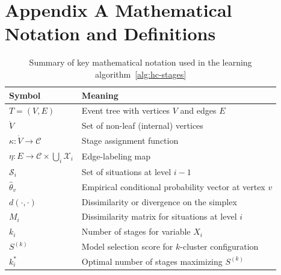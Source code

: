 \documentclass[preprint,12pt]{elsarticle}
\begin{document}



\section*{Appendix A Mathematical Notation and Definitions}
\begin{table}[H]
\centering
\caption{Summary of key mathematical notation used in the learning algorithm~\ref{alg:hc-stages}}
\begin{tabular}{ll}
\toprule
\textbf{Symbol} & \textbf{Meaning} \\
\midrule
$T = (V,E)$ & Event tree with vertices $V$ and edges $E$ \\
$\mathring{V}$ & Set of non-leaf (internal) vertices \\
$\kappa : \mathring{V} \to \mathcal{C}$ & Stage assignment function \\
$\eta : E \to \mathcal{C} \times \bigcup_i \mathcal{X}_i$ & Edge-labeling map \\
$\mathcal{S}_i$ & Set of situations at level $i-1$ \\
$\hat{\theta}_v$ & Empirical conditional probability vector at vertex $v$ \\
$d(\cdot, \cdot)$ & Dissimilarity or divergence on the simplex \\
$M_i$ & Dissimilarity matrix for situations at level $i$ \\
$k_i$ & Number of stages for variable $X_i$ \\
$S^{(k)}$ & Model selection score for $k$-cluster configuration \\
$k_i^*$ & Optimal number of stages maximizing $S^{(k)}$ \\
\bottomrule
\end{tabular}
\end{table}
\end{document}
